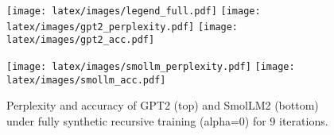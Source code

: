 \begin{figure}[t]
    \centering
    \texttt{[image: latex/images/legend\_full.pdf]} \hfill
    \texttt{[image: latex/images/gpt2\_perplexity.pdf]} \hfill
    \texttt{[image: latex/images/gpt2\_acc.pdf]} \hfill

    \texttt{[image: latex/images/smollm\_perplexity.pdf]} \hfill
    \texttt{[image: latex/images/smollm\_acc.pdf]} \hfill
    
    \caption{Perplexity and accuracy of GPT2 (top) and SmolLM2 (bottom) under fully synthetic recursive training (alpha=0) for 9 iterations.}
    \label{fig:fully_synthetic}
\end{figure}